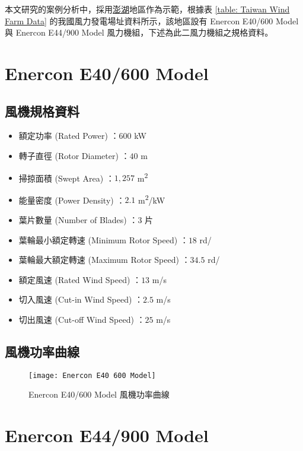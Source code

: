

本文研究的案例分析中，採用\uline{澎湖}地區作為示範，根據表 \ref{table: Taiwan Wind Farm Data} 的我國風力發電場址資料所示，該地區設有 Enercon E40/600 Model 與 Enercon E44/900 Model 風力機組，下述為此二風力機組之規格資料。

\section{Enercon E40/600 Model}

\subsection*{風機規格資料}

\begin{itemize}
  \item 額定功率 (Rated Power) ：$600$ \si{\kW}
  \item 轉子直徑 (Rotor Diameter) ：$40$ \si{\meter}
  \item 掃掠面積 (Swept Area) ：$1,257$ \si{\meter\squared}
  \item 能量密度 (Power Density) ：$2.1$ \si{\meter\squared}/\si{\kW}
  \item 葉片數量 (Number of Blades) ：$3$ 片
  \item 葉輪最小額定轉速 (Minimum Rotor Speed) ：$18$ \si{rd}/\si{\min}
  \item 葉輪最大額定轉速 (Maximum Rotor Speed) ：$34.5$ \si{rd}/\si{\min}
  \item 額定風速 (Rated Wind Speed) ：$13$ \si{m}/\si{s}
  \item 切入風速 (Cut-in Wind Speed) ：$2.5$ \si{m}/\si{s}
  \item 切出風速 (Cut-off Wind Speed) ：$25$ \si{m}/\si{s}
\end{itemize}

\subsection*{風機功率曲線}

\begin{figure}[htbp]
  \centering
  \texttt{[image: Enercon E40 600 Model]}
  \caption{Enercon E40/600 Model 風機功率曲線}
  \label{figure: Enercon E40/600 Model}
\end{figure}

\section{Enercon E44/900 Model}

